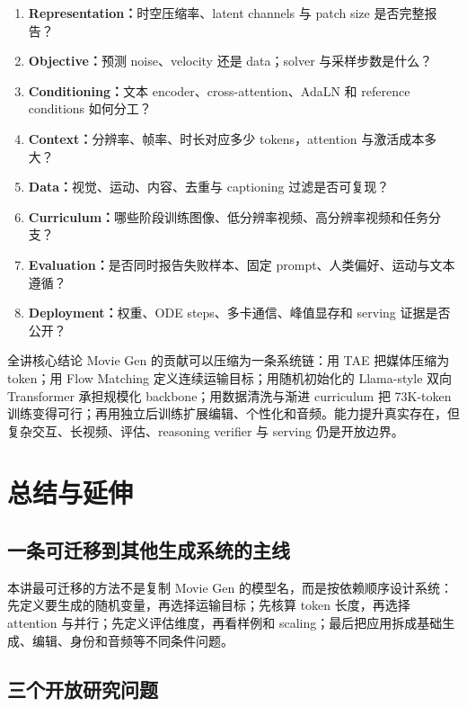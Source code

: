 \documentclass[a4paper]{article}
\begin{document}
\begin{enumerate}
  \item \textbf{Representation：}时空压缩率、latent channels 与 patch size 是否完整报告？
  \item \textbf{Objective：}预测 noise、velocity 还是 data；solver 与采样步数是什么？
  \item \textbf{Conditioning：}文本 encoder、cross-attention、AdaLN 和 reference conditions 如何分工？
  \item \textbf{Context：}分辨率、帧率、时长对应多少 tokens，attention 与激活成本多大？
  \item \textbf{Data：}视觉、运动、内容、去重与 captioning 过滤是否可复现？
  \item \textbf{Curriculum：}哪些阶段训练图像、低分辨率视频、高分辨率视频和任务分支？
  \item \textbf{Evaluation：}是否同时报告失败样本、固定 prompt、人类偏好、运动与文本遵循？
  \item \textbf{Deployment：}权重、ODE steps、多卡通信、峰值显存和 serving 证据是否公开？
\end{enumerate}

\begin{importantbox}{全讲核心结论}
Movie Gen 的贡献可以压缩为一条系统链：用 TAE 把媒体压缩为 token；用 Flow Matching 定义连续运输目标；用随机初始化的 Llama-style 双向 Transformer 承担规模化 backbone；用数据清洗与渐进 curriculum 把 73K-token 训练变得可行；再用独立后训练扩展编辑、个性化和音频。能力提升真实存在，但复杂交互、长视频、评估、reasoning verifier 与 serving 仍是开放边界。
\end{importantbox}

\section{总结与延伸}

\subsection{一条可迁移到其他生成系统的主线}

本讲最可迁移的方法不是复制 Movie Gen 的模型名，而是按依赖顺序设计系统：先定义要生成的随机变量，再选择运输目标；先核算 token 长度，再选择 attention 与并行；先定义评估维度，再看样例和 scaling；最后把应用拆成基础生成、编辑、身份和音频等不同条件问题。

\subsection{三个开放研究问题}
\end{document}
